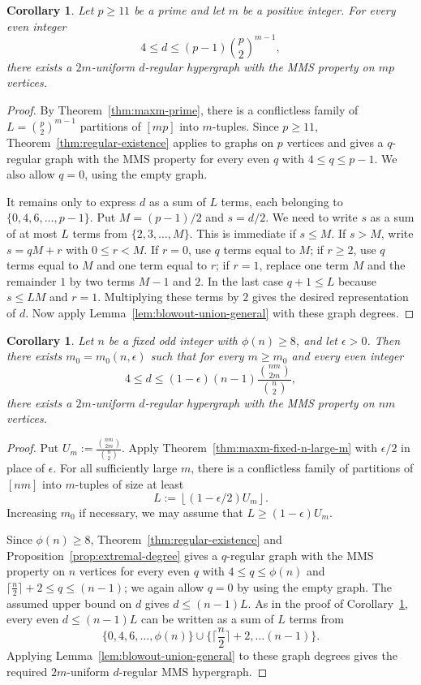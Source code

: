 \documentclass[12pt,UKenglish]{amsart}
\theoremstyle{plain}
\newtheorem{cor}[thm]{Corollary}
\theoremstyle{definition}
\theoremstyle{remark}
\begin{document}
 \begin{cor}\label{cor:prime-blowout}
  Let $p\ge 11$ be a prime and let $m$ be a positive integer. For every even integer
  \[
  4\le d\le (p-1)\binom{p}{2}^{m-1},
  \]
  there exists a $2m$-uniform $d$-regular hypergraph with the MMS property on $mp$ vertices.
 \end{cor}
\begin{proof}
By Theorem~\ref{thm:maxm-prime}, there is a conflictless family of
\(
L=\binom{p}{2}^{m-1}
\)
partitions of $[mp]$ into $m$-tuples. Since $p\ge11$, Theorem~\ref{thm:regular-existence} applies to graphs on $p$ vertices and gives a $q$-regular graph with the MMS property for every even $q$ with $4\le q\le p-1$. We also allow $q=0$, using the empty graph.

It remains only to express $d$ as a sum of $L$ terms, each belonging to $\{0,4,6,\dots,p-1\}$. Put $M=(p-1)/2$ and $s=d/2$. We need to write $s$ as a sum of at most $L$ terms from $\{2,3,\dots,M\}$. This is immediate if $s\le M$. If $s>M$, write $s=qM+r$ with $0\le r<M$. If $r=0$, use $q$ terms equal to $M$; if $r\ge2$, use $q$ terms equal to $M$ and one term equal to $r$; if $r=1$, replace one term $M$ and the remainder $1$ by two terms $M-1$ and $2$. In the last case $q+1\le L$ because $s\le LM$ and $r=1$. Multiplying these terms by $2$ gives the desired representation of $d$. Now apply Lemma~\ref{lem:blowout-union-general} with these graph degrees.
\end{proof}

\begin{cor}\label{cor:fixed-n-near-optimal-blowout}
Let \(n\) be a fixed odd integer with \(\phi(n)\ge 8\), and let
\(\epsilon>0\). Then there exists \(m_0=m_0(n,\epsilon)\) such that for
every \(m\ge m_0\) and every even integer
\[
4\le d\le (1-\epsilon)(n-1)\frac{\binom{nm}{2m}}{\binom n2},
\]
there exists a \(2m\)-uniform \(d\)-regular hypergraph with the MMS property
on \(nm\) vertices.
\end{cor}
\begin{proof}
Put
\(
U_m:=\frac{\binom{nm}{2m}}{\binom n2}.
\)
Apply Theorem~\ref{thm:maxm-fixed-n-large-m} with $\epsilon/2$ in place of $\epsilon$. For all sufficiently large $m$, there is a conflictless family of partitions of $[nm]$ into $m$-tuples of size at least
\[
L:=\left\lfloor (1-\epsilon/2)U_m\right\rfloor.
\]
Increasing $m_0$ if necessary, we may assume that $L\ge (1-\epsilon)U_m$.

Since \(\phi(n)\ge 8\), Theorem~\ref{thm:regular-existence} and Proposition~\ref{prop:extremal-degree} gives a $q$-regular graph with the MMS property on $n$ vertices for every even $q$ with $4\le q\le \phi(n)$ and $\lceil\frac{n}{2}\rceil+2\leq q\le (n-1)$; we again allow $q=0$ by using the empty graph. The assumed upper bound on $d$ gives $d\le (n-1)L$. As in the proof of Corollary~\ref{cor:prime-blowout}, every even $d\le (n-1)L$ can be written as a sum of $L$ terms from $$\{0,4,6,\dots,\phi(n)\}\cup\{\lceil\frac{n}{2}\rceil+2,\dots (n-1)\}.$$ Applying Lemma~\ref{lem:blowout-union-general} to these graph degrees gives the required $2m$-uniform $d$-regular MMS hypergraph.
\end{proof}



\end{document}
